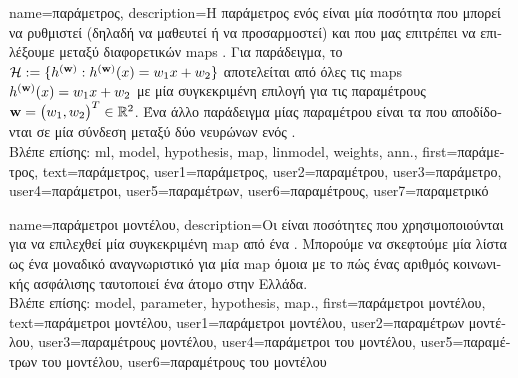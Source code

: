 {name={\foreignlanguage{greek}{παράμετρος}},
	description={\foreignlanguage{greek}{Η παράμετρος ενός}   
		\foreignlanguage{greek}{είναι μία ποσότητα που μπορεί να ρυθμιστεί (δηλαδή να μαθευτεί ή να προσαρμοστεί) και που μας επιτρέπει 
		να επιλέξουμε μεταξύ διαφορετικών} \gls{map}s . \foreignlanguage{greek}{Για παράδειγμα, το}  
		$\mathcal{H} := \{h^{({\bf w})}: h^{({\bf w})}(x)= w_{1} x + w_{2}\}$ 
		\foreignlanguage{greek}{αποτελείται από όλες τις} \gls{map}s  $h^{({\bf w})}(x)= w_{1} x + w_{2}$ 
		\foreignlanguage{greek}{με μία συγκεκριμένη επιλογή για τις παραμέτρους ${\bf w} = \big(w_{1},w_{2}\big)^{T} \in \mathbb{R}^{2}$. 
		Ένα άλλο παράδειγμα μίας παραμέτρου}  \foreignlanguage{greek}{είναι τα}  
		\foreignlanguage{greek}{που αποδίδονται σε μία σύνδεση μεταξύ δύο νευρώνων ενός} .\\
		\foreignlanguage{greek}{Βλέπε επίσης:} \gls{ml}, \gls{model}, \gls{hypothesis}, \gls{map}, \gls{linmodel}, \gls{weights}, \gls{ann}.},
	first={\foreignlanguage{greek}{παράμετρος}},
	text={\foreignlanguage{greek}{παράμετρος}},
	user1={\foreignlanguage{greek}{παράμετρος}}, %
	user2={\foreignlanguage{greek}{παραμέτρου}}, %
	user3={\foreignlanguage{greek}{παράμετρο}}, %
	user4={\foreignlanguage{greek}{παράμετροι}}, %
	user5={\foreignlanguage{greek}{παραμέτρων}}, %
	user6={\foreignlanguage{greek}{παραμέτρους}}, %
	user7={\foreignlanguage{greek}{παραμετρικό}} %
}

{name={\foreignlanguage{greek}{παράμετροι μοντέλου}}, 
	description={\foreignlanguage{greek}{Οι}   
		\foreignlanguage{greek}{είναι ποσότητες που χρησιμοποιούνται για να επιλεχθεί μία συγκεκριμένη} \gls{map}  
		 \foreignlanguage{greek}{από ένα} . 
		\foreignlanguage{greek}{Μπορούμε να σκεφτούμε μία λίστα}   
		\foreignlanguage{greek}{ως ένα μοναδικό αναγνωριστικό για μία} \gls{map}  
		\foreignlanguage{greek}{όμοια με το πώς ένας αριθμός κοινωνικής ασφάλισης ταυτοποιεί ένα άτομο στην Ελλάδα.} \\
		\foreignlanguage{greek}{Βλέπε επίσης:} \gls{model}, \gls{parameter}, \gls{hypothesis}, \gls{map}.},
	first={\foreignlanguage{greek}{παράμετροι μοντέλου}},
	text={\foreignlanguage{greek}{παράμετροι μοντέλου}},
	user1={\foreignlanguage{greek}{παράμετροι μοντέλου}}, %
	user2={\foreignlanguage{greek}{παραμέτρων μοντέλου}}, %
	user3={\foreignlanguage{greek}{παραμέτρους μοντέλου}}, %
	user4={\foreignlanguage{greek}{παράμετροι του μοντέλου}}, %
	user5={\foreignlanguage{greek}{παραμέτρων του μοντέλου}}, %
	user6={\foreignlanguage{greek}{παραμέτρους του μοντέλου}} %
}

